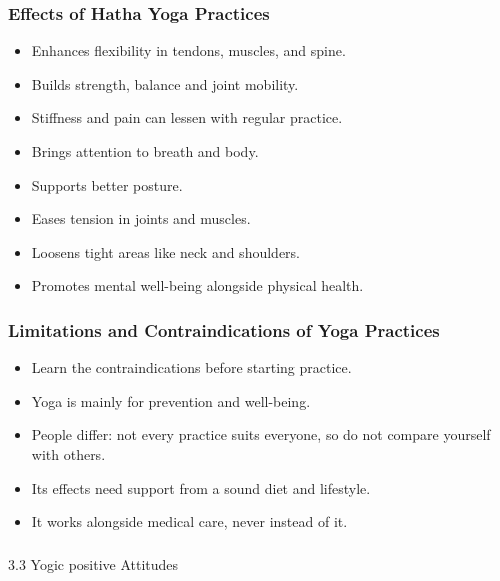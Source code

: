 \begin{frame}[fragile]\frametitle{Effects of Hatha Yoga Practices}
      \begin{itemize}
        \item Enhances flexibility in tendons, muscles, and spine.
        \item Builds strength, balance and joint mobility.
        \item Stiffness and pain can lessen with regular practice.
        \item Brings attention to breath and body.
        \item Supports better posture.
        \item Eases tension in joints and muscles.
        \item Loosens tight areas like neck and shoulders.
        \item Promotes mental well-being alongside physical health.
      \end{itemize}
\end{frame}

\begin{frame}[fragile]\frametitle{Limitations and Contraindications of Yoga Practices}
      \begin{itemize}
        \item Learn the contraindications before starting practice.
        \item Yoga is mainly for prevention and well-being.
        \item People differ: not every practice suits everyone, so do not compare yourself with others.
        \item Its effects need support from a sound diet and lifestyle.
        \item It works alongside medical care, never instead of it.
      \end{itemize}
\end{frame}


\begin{frame}[fragile]\frametitle{}
\begin{center}
{\Large 3.3 Yogic positive Attitudes}
\end{center}
\end{frame}

